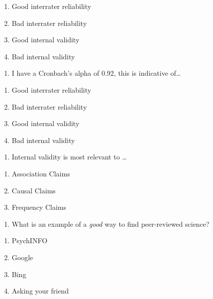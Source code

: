 \documentclass[
  12pt,
  letterpaper,
  DIV=11,
  numbers=noendperiod]{scrartcl}
\providecommand{\tightlist}{%
  \setlength{\itemsep}{0pt}\setlength{\parskip}{0pt}}\usepackage{longtable,booktabs,array}
\begin{document}
\begin{enumerate}
\def\labelenumi{\alph{enumi}.}
\tightlist
\item
  Good interrater reliability
\item
  Bad interrater reliability
\item
  Good internal validity
\item
  Bad internal validity
\end{enumerate}

\begin{enumerate}
\def\labelenumi{\arabic{enumi}.}
\setcounter{enumi}{31}
\tightlist
\item
  I have a Cronbach's alpha of 0.92, this is indicative of\ldots{}
\end{enumerate}

\begin{enumerate}
\def\labelenumi{\alph{enumi}.}
\tightlist
\item
  Good interrater reliability
\item
  Bad interrater reliability
\item
  Good internal validity
\item
  Bad internal validity
\end{enumerate}

\begin{enumerate}
\def\labelenumi{\arabic{enumi}.}
\setcounter{enumi}{32}
\tightlist
\item
  Internal validity is most relevant to \ldots{}
\end{enumerate}

\begin{enumerate}
\def\labelenumi{\alph{enumi}.}
\tightlist
\item
  Association Claims
\item
  Causal Claims
\item
  Frequency Claims
\end{enumerate}

\begin{enumerate}
\def\labelenumi{\arabic{enumi}.}
\setcounter{enumi}{33}
\tightlist
\item
  What is an example of a \emph{good} way to find peer-reviewed science?
\end{enumerate}

\begin{enumerate}
\def\labelenumi{\alph{enumi}.}
\tightlist
\item
  PsychINFO
\item
  Google
\item
  Bing
\item
  Asking your friend
\end{enumerate}
\end{document}
